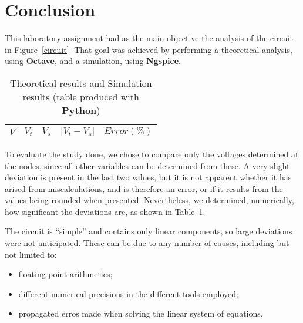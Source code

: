 \section{Conclusion}
\label{sec:conclusion}

This laboratory assignment had as the main objective the analysis of the circuit in Figure~\ref{circuit}. That goal was achieved by performing a theoretical analysis, using {\bf Octave}, and a simulation, using {\bf Ngspice}.

\begin{table}[H]
  \centering
  \begin{tabular}{|c|c|c|c|c|}
    \hline
        $V$ & $V_t$ & $V_s$ & $|V_t-V_s|$ & $Error (\%)$\footnotemark \\
        \hline
        \hline
        
        \hline
  \end{tabular}
  \caption{Theoretical results and Simulation results (table produced with {\bf Python})}
  \label{error_res}
\end{table}


\newpage

To evaluate the study done, we chose to compare only the voltages determined at the nodes, since all other variables can be determined from these. A very slight deviation is present in the last two values, but it is not apparent whether it has arised from miscalculations, and is therefore an error, or if it results from the values being rounded when presented. Nevertheless, we determined, numerically, how significant the deviations are, as shown in Table~\ref{error_res}.



The circuit is ``simple'' and contains only linear components, so large deviations were not anticipated. These can be due to any number of causes, including but not limited to:

\begin{itemize}
\item floating point arithmetics;
\item different numerical precisions in the different tools employed;
\item propagated erros made when solving the linear system of equations.
\end{itemize}


